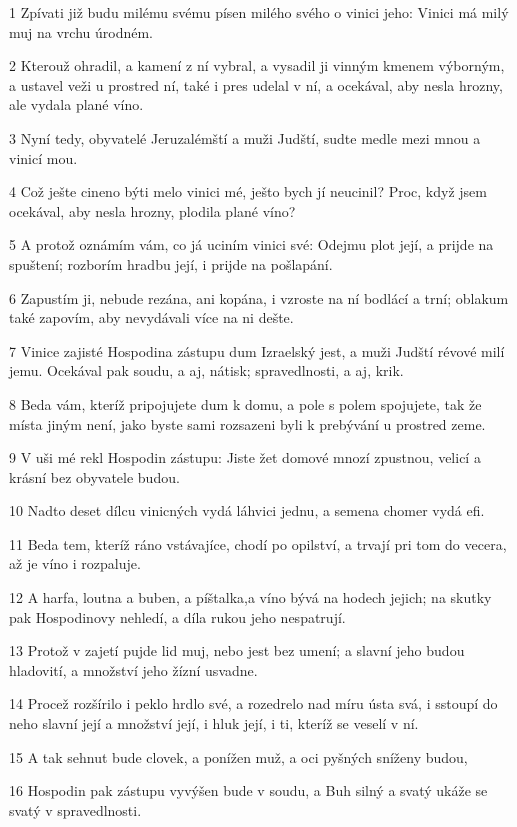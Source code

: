 \par 1 Zpívati již budu milému svému písen milého svého o vinici jeho: Vinici má milý muj na vrchu úrodném.
\par 2 Kterouž ohradil, a kamení z ní vybral, a vysadil ji vinným kmenem výborným, a ustavel veži u prostred ní, také i pres udelal v ní, a ocekával, aby nesla hrozny, ale vydala plané víno.
\par 3 Nyní tedy, obyvatelé Jeruzalémští a muži Judští, sudte medle mezi mnou a vinicí mou.
\par 4 Což ješte cineno býti melo vinici mé, ješto bych jí neucinil? Proc, když jsem ocekával, aby nesla hrozny, plodila plané víno?
\par 5 A protož oznámím vám, co já uciním vinici své: Odejmu plot její, a prijde na spuštení; rozborím hradbu její, i prijde na pošlapání.
\par 6 Zapustím ji, nebude rezána, ani kopána, i vzroste na ní bodlácí a trní; oblakum také zapovím, aby nevydávali více na ni dešte.
\par 7 Vinice zajisté Hospodina zástupu dum Izraelský jest, a muži Judští révové milí jemu. Ocekával pak soudu, a aj, nátisk; spravedlnosti, a aj, krik.
\par 8 Beda vám, kteríž pripojujete dum k domu, a pole s polem spojujete, tak že místa jiným není, jako byste sami rozsazeni byli k prebývání u prostred zeme.
\par 9 V uši mé rekl Hospodin zástupu: Jiste žet domové mnozí zpustnou, velicí a krásní bez obyvatele budou.
\par 10 Nadto deset dílcu vinicných vydá láhvici jednu, a semena chomer vydá efi.
\par 11 Beda tem, kteríž ráno vstávajíce, chodí po opilství, a trvají pri tom do vecera, až je víno i rozpaluje.
\par 12 A harfa, loutna a buben, a píštalka,a víno bývá na hodech jejich; na skutky pak Hospodinovy nehledí, a díla rukou jeho nespatrují.
\par 13 Protož v zajetí pujde lid muj, nebo jest bez umení; a slavní jeho budou hladovití, a množství jeho žízní usvadne.
\par 14 Procež rozšírilo i peklo hrdlo své, a rozedrelo nad míru ústa svá, i sstoupí do neho slavní její a množství její, i hluk její, i ti, kteríž se veselí v ní.
\par 15 A tak sehnut bude clovek, a ponížen muž, a oci pyšných sníženy budou,
\par 16 Hospodin pak zástupu vyvýšen bude v soudu, a Buh silný a svatý ukáže se svatý v spravedlnosti.
